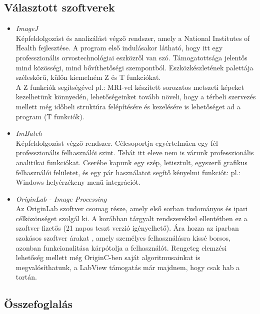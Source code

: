 \documentclass[a4paper,12pt,oneside]{report}
\begin{document}
\subsection{Választott szoftverek}
\begin{itemize}

    \item \emph{ImageJ}\cite{website:imagej}\\
    Képfeldolgozást és analizálást végző rendszer, amely a National Institutes of Health fejlesztése.
	A program első indulásakor látható, hogy itt egy professzionális orvostechnológiai eszközről van szó.
	Támogatottsága jelentős mind közösségi, mind bővíthetőségi szempontból. Eszközkészletének palettája széleskörű, külön kiemelném Z és T funkciókat.\cite{article:imagej_article}\\A Z funkciók segítségével pl.: MRI-vel készített sorozatos metszeti képeket kezelhetünk könnyedén, lehetőségeinket tovább növeli, hogy a térbeli szervezés mellett még időbeli struktúra felépítésére és kezelésére is lehetőséget ad a program (T funkciók).
    
    \item \emph{ImBatch}\cite{website:imbatch}\\
    Képfeldolgozást végző rendszer. Célcsoportja egyértelműen egy fél professzionális felhasználói szint. Tehát itt eleve nem is várunk professzionális analitikai funkciókat. Cserébe kapunk egy szép, letisztult, egyszerű grafikus felhasználói felületet, és egy pár használatot segítő kényelmi funkciót: pl.: Windows helyérzékeny menü integrációt.
    
    \item \emph{OriginLab - Image Processing}\cite{website:originlab}\\
	Az OriginLab szoftver csomag része, amely első sorban tudományos és ipari célközönséget szolgál ki. \cite{website:originlab_about} A korábban tárgyalt rendszerekkel ellentétben ez a szoftver fizetős (21 napos teszt verzió igényelhető). Ára hozza az iparban szokásos szoftver árakat \cite{website:originlab_usd}, amely személyes felhasználásra kissé borsos, azonban funkcionalitása kárpótolja a felhasználót. Rengeteg elemzési lehetőség mellett még OriginC-ben saját algoritmusainkat is megvalósíthatunk, a LabView támogatás már majdnem, hogy csak hab a tortán.\\
\end{itemize}
	

\subsection{Összefoglalás}
\end{document}
